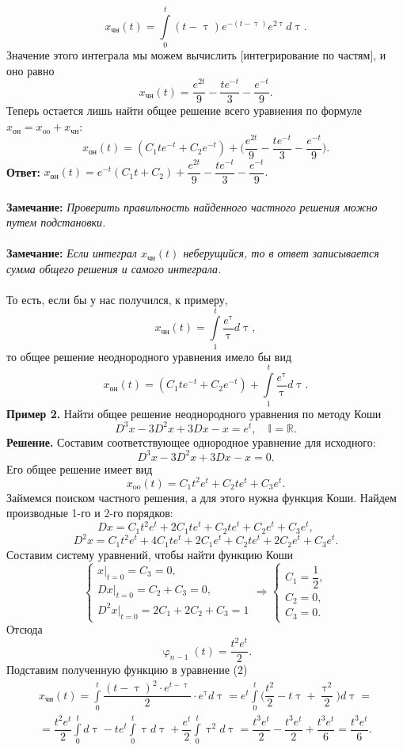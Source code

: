 \documentclass[a4paper, 12pt]{article}
\newcommand{\Rm}{\mathbb{R}}
\newcommand{\I}{\mathbb{I}}
\renewcommand{\varphi}{\upvarphi}
\renewcommand{\tau}{\uptau}
\begin{document}
$$x_\text{чн}(t) = \int\limits_{0}^t(t - \uptau)e^{-(t-\uptau)}e^{2\uptau}d\uptau.$$
Значение этого интеграла мы можем вычислить [интегрирование по частям], и оно равно $$x_\text{чн}(t) = \dfrac{e^{2t}}{9} - \dfrac{te^{-t}}{3} - \dfrac{e^{-t}}{9}.$$
Теперь остается лишь найти общее решение всего уравнения по формуле $x_\text{он} = x_\text{oo} + x_\text{чн}$:
$$x_\text{он}(t) = (C_1te^{-t} + C_2e^{-t}) + \Big(\dfrac{e^{2t}}{9} - \dfrac{te^{-t}}{3} - \dfrac{e^{-t}}{9}\Big).$$
\textbf{Ответ:} $x_\text{он}(t) = e^{-t}(C_1t + C_2) + \dfrac{e^{2t}}{9} - \dfrac{te^{-t}}{3} - \dfrac{e^{-t}}{9}.$\\\\
\textbf{Замечание:} \textit{Проверить правильность найденного частного решения можно путем подстановки.}\\\\
\textbf{Замечание:} \textit{Если интеграл $x_\text{чн}(t)$ неберущийся, то в ответ записывается сумма общего решения и самого интеграла.}\\\\
То есть, если бы у нас получился, к примеру, $$x_\text{чн}(t) = \int\limits_{1}^{t}\dfrac{e^\tau}{\tau}d\tau,$$
то общее решение неоднородного уравнения имело бы вид
$$x_\text{он}(t) = (C_1te^{-t} + C_2e^{-t}) + \int\limits_{1}^{t}\dfrac{e^\tau}{\tau}d\tau.$$
\textbf{Пример 2.} Найти общее решение неоднородного уравнения по методу Коши
$$D^3x - 3D^2x + 3Dx - x = e^t,\quad \I = \Rm.$$
\textbf{Решение.} Составим соответствующее однородное уравнение для исходного:
$$D^3x - 3D^2x + 3Dx - x = 0.$$
Его общее решение имеет вид
$$x_\text{oo}(t) = C_1t^2e^t +C_2te^t + C_3e^t.$$
Займемся поиском частного решения, а для этого нужна функция Коши. Найдем производные 1-го и 2-го порядков:
$$Dx = C_1t^2e^t + 2C_1te^t + C_2te^t + C_2e^t + C_3 e^t,$$
$$D^2x = C_1t^2e^t + 4C_1te^t + 2C_1e^t + C_2te^t + 2C_2e^t + C_3 e^t.$$
Составим систему уравнений, чтобы найти функцию Коши
$$\begin{cases}
	x|_{t=0} = C_3 = 0,\\
	Dx|_{t=0} = C_2 + C_3 = 0,\\
	D^2x|_{t=0} = 2C_1 + 2C_2 + C_3 = 1
\end{cases}\Rightarrow \begin{cases}
C_1 = \dfrac{1}{2},\\
C_2 = 0,\\
C_3 = 0.
\end{cases}$$
Отсюда
$$\varphi_{n-1}(t) = \dfrac{t^2e^t}{2}.$$
Подставим полученную функцию в уравнение (2)
\begin{multline*}
	x_\text{чн}(t) = \int\limits_0^t\dfrac{(t-\tau)^2\cdot e^{t-\tau}}{2}\cdot e^\tau d\tau = e^t\int\limits_0^t\Big(\dfrac{t^2}{2} - t\tau + \dfrac{\tau^2}{2}\Big)d\tau =\\= \dfrac{t^2e^t}{2}\int\limits_0^td\tau - te^t\int\limits_0^t\tau d\tau + \dfrac{e^t}{2}\int\limits_0^t\tau^2d\tau = \dfrac{t^3e^t}{2} - \dfrac{t^3e^t}{2} + \dfrac{t^3e^t}{6} = \dfrac{t^3e^t}{6}.
\end{multline*}
\end{document}
